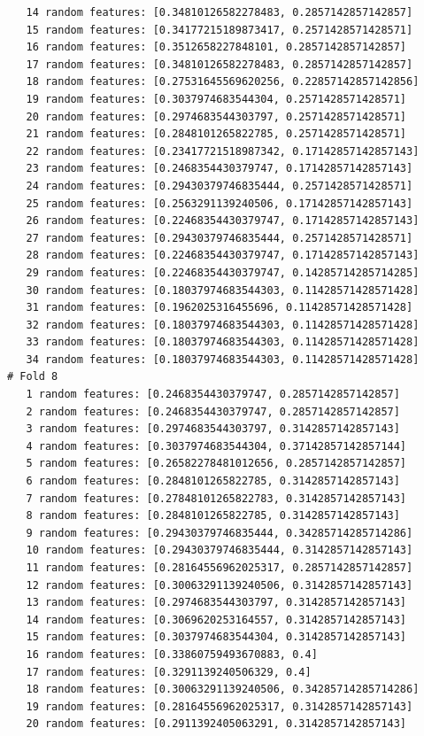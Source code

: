 \documentclass[12pt]{amsart}
\begin{document}
\begin{verbatim}
   14 random features: [0.34810126582278483, 0.2857142857142857]
   15 random features: [0.34177215189873417, 0.2571428571428571]
   16 random features: [0.3512658227848101, 0.2857142857142857]
   17 random features: [0.34810126582278483, 0.2857142857142857]
   18 random features: [0.27531645569620256, 0.22857142857142856]
   19 random features: [0.3037974683544304, 0.2571428571428571]
   20 random features: [0.2974683544303797, 0.2571428571428571]
   21 random features: [0.2848101265822785, 0.2571428571428571]
   22 random features: [0.23417721518987342, 0.17142857142857143]
   23 random features: [0.2468354430379747, 0.17142857142857143]
   24 random features: [0.29430379746835444, 0.2571428571428571]
   25 random features: [0.2563291139240506, 0.17142857142857143]
   26 random features: [0.22468354430379747, 0.17142857142857143]
   27 random features: [0.29430379746835444, 0.2571428571428571]
   28 random features: [0.22468354430379747, 0.17142857142857143]
   29 random features: [0.22468354430379747, 0.14285714285714285]
   30 random features: [0.18037974683544303, 0.11428571428571428]
   31 random features: [0.1962025316455696, 0.11428571428571428]
   32 random features: [0.18037974683544303, 0.11428571428571428]
   33 random features: [0.18037974683544303, 0.11428571428571428]
   34 random features: [0.18037974683544303, 0.11428571428571428]
# Fold 8
   1 random features: [0.2468354430379747, 0.2857142857142857]
   2 random features: [0.2468354430379747, 0.2857142857142857]
   3 random features: [0.2974683544303797, 0.3142857142857143]
   4 random features: [0.3037974683544304, 0.37142857142857144]
   5 random features: [0.26582278481012656, 0.2857142857142857]
   6 random features: [0.2848101265822785, 0.3142857142857143]
   7 random features: [0.27848101265822783, 0.3142857142857143]
   8 random features: [0.2848101265822785, 0.3142857142857143]
   9 random features: [0.29430379746835444, 0.34285714285714286]
   10 random features: [0.29430379746835444, 0.3142857142857143]
   11 random features: [0.28164556962025317, 0.2857142857142857]
   12 random features: [0.30063291139240506, 0.3142857142857143]
   13 random features: [0.2974683544303797, 0.3142857142857143]
   14 random features: [0.3069620253164557, 0.3142857142857143]
   15 random features: [0.3037974683544304, 0.3142857142857143]
   16 random features: [0.33860759493670883, 0.4]
   17 random features: [0.3291139240506329, 0.4]
   18 random features: [0.30063291139240506, 0.34285714285714286]
   19 random features: [0.28164556962025317, 0.3142857142857143]
   20 random features: [0.2911392405063291, 0.3142857142857143]

\end{verbatim}
\end{document}
